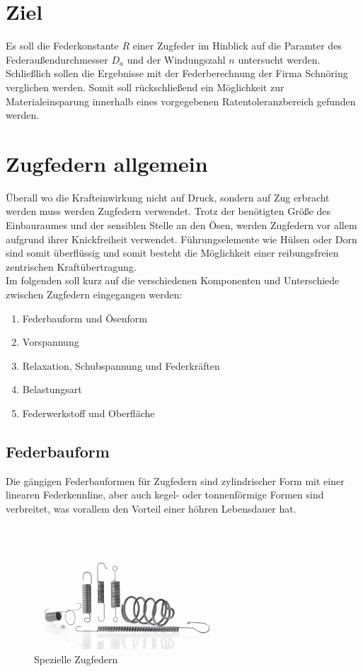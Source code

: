 \newpage
\section*{Ziel}
Es soll die Federkonstante $R$ einer Zugfeder im Hinblick auf die Paramter des Federaußendurchmesser $D_a$ und der Windungszahl $n$
untersucht werden. Schließlich sollen die Ergebnisse mit der Federberechnung der Firma Schnöring verglichen werden.
Somit soll rückschließend ein Möglichkeit zur Materialeinsparung 
innerhalb eines vorgegebenen Ratentoleranzbereich gefunden werden.  

\section{Zugfedern allgemein}
Überall wo die Krafteinwirkung nicht auf Druck, sondern auf Zug erbracht werden muss
werden Zugfedern verwendet. Trotz der benötigten Größe des Einbauraumes und der sensiblen
Stelle an den Ösen, werden Zugfedern vor allem aufgrund ihrer Knickfreiheit verwendet.
Führungselemente wie Hülsen oder Dorn sind somit überflüssig und somit besteht die Möglichkeit
einer reibungsfreien zentrischen Kraftübertragung.\\
Im folgenden soll kurz auf die verschiedenen Komponenten und Unterschiede zwischen
Zugfedern eingegangen werden:
\begin{enumerate}
    \item Federbauform und Ösenform
    \item Vorspannung
    \item Relaxation, Schubspannung und Federkräften
    \item Belastungsart
    \item Federwerkstoff und Oberfläche
\end{enumerate}



\subsection{Federbauform}
Die gängigen Federbauformen für Zugfedern sind zylindrischer Form mit einer linearen
Federkennline, aber auch kegel- oder tonnenförmige Formen sind verbreitet, was vorallem
den Vorteil einer höhren Lebensdauer hat.
\begin{figure}[H]
    \centering
    \includegraphics[width=0.6\textwidth]{bilder/Input/zugfedern_spezial.jpg}
    \caption{Spezielle Zugfedern \cite{KompZ}}
\end{figure}



